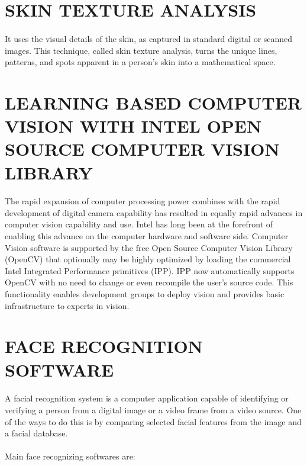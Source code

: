 \documentclass[10pt,a4paper,twoside]{report}
\begin{document}
\section{SKIN  TEXTURE ANALYSIS}
\paragraph{ }It uses the visual details of the skin, as captured in standard digital or scanned images. This technique, called skin texture analysis, turns the unique lines, patterns, and spots apparent in a person’s skin into a mathematical space.
\section{LEARNING BASED COMPUTER VISION WITH INTEL OPEN SOURCE COMPUTER VISION LIBRARY}
\paragraph{ }The rapid expansion of computer processing power combines with the rapid development of digital camera capability has resulted in equally rapid advances in computer vision capability and use. Intel has long been at the forefront of enabling this advance on the computer hardware and software side. Computer Vision software is supported by the free Open Source Computer Vision Library (OpenCV) that optionally may be highly optimized by loading the commercial Intel Integrated Performance primitives (IPP). IPP now automatically supports OpenCV with no need to change  or even recompile the user’s source code. This functionality enables development groups to deploy vision and provides basic infrastructure to experts in vision.

\section{FACE RECOGNITION SOFTWARE}
\paragraph{ }A facial recognition system is a computer application capable of identifying or verifying a person from a digital image or a video frame from a video source. One of the ways to do this is by comparing selected facial features from the image and a facial database.
\paragraph{ }Main face recognizing softwares are:
\end{document}

